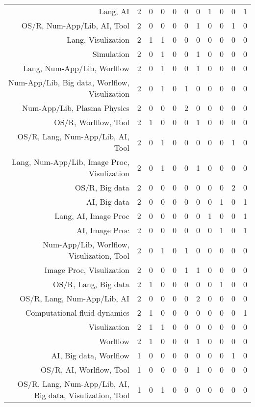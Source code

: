 {\begin{landscape}
\begin{longtable}[htb]{r|c|c|c|c|c|c|c|c|c|c}
{Lang, AI} & 2 & 0 & 0 & 0 & 0 & 0 & 1 & 0 & 0 & 1 \\%
{OS/R, Num-App/Lib, AI, Tool} & 2 & 0 & 0 & 0 & 0 & 1 & 0 & 0 & 1 & 0 \\%
{Lang, Visulization} & 2 & 1 & 1 & 0 & 0 & 0 & 0 & 0 & 0 & 0 \\%
{Simulation} & 2 & 0 & 1 & 0 & 0 & 1 & 0 & 0 & 0 & 0 \\%
{Lang, Num-App/Lib, Worlflow} & 2 & 0 & 1 & 0 & 0 & 1 & 0 & 0 & 0 & 0 \\%
{Num-App/Lib, Big data, Worlflow, Visulization} & 2 & 0 & 1 & 0 & 1 & 0 & 0 & 0 & 0 & 0 \\%
{Num-App/Lib, Plasma Physics} & 2 & 0 & 0 & 0 & 2 & 0 & 0 & 0 & 0 & 0 \\%
{OS/R, Worlflow, Tool} & 2 & 1 & 0 & 0 & 0 & 1 & 0 & 0 & 0 & 0 \\%
{OS/R, Lang, Num-App/Lib, AI, Tool} & 2 & 0 & 1 & 0 & 0 & 0 & 0 & 0 & 1 & 0 \\%
{Lang, Num-App/Lib, Image Proc, Visulization} & 2 & 0 & 1 & 0 & 0 & 1 & 0 & 0 & 0 & 0 \\%
{OS/R, Big data} & 2 & 0 & 0 & 0 & 0 & 0 & 0 & 0 & 2 & 0 \\%
{AI, Big data} & 2 & 0 & 0 & 0 & 0 & 0 & 0 & 1 & 0 & 1 \\%
{Lang, AI, Image Proc} & 2 & 0 & 0 & 0 & 0 & 0 & 1 & 0 & 0 & 1 \\%
{AI, Image Proc} & 2 & 0 & 0 & 0 & 0 & 0 & 0 & 1 & 0 & 1 \\%
{Num-App/Lib, Worlflow, Visulization, Tool} & 2 & 0 & 1 & 0 & 1 & 0 & 0 & 0 & 0 & 0 \\%
{Image Proc, Visulization} & 2 & 0 & 0 & 0 & 1 & 1 & 0 & 0 & 0 & 0 \\%
{OS/R, Lang, Big data} & 2 & 1 & 0 & 0 & 0 & 0 & 0 & 1 & 0 & 0 \\%
{OS/R, Lang, Num-App/Lib, AI} & 2 & 0 & 0 & 0 & 0 & 2 & 0 & 0 & 0 & 0 \\%
{Computational fluid dynamics} & 2 & 1 & 0 & 0 & 0 & 0 & 0 & 0 & 0 & 1 \\%
{Visulization} & 2 & 1 & 1 & 0 & 0 & 0 & 0 & 0 & 0 & 0 \\%
{Worlflow} & 2 & 1 & 0 & 0 & 0 & 1 & 0 & 0 & 0 & 0 \\%
{AI, Big data, Worlflow} & 1 & 0 & 0 & 0 & 0 & 0 & 0 & 0 & 1 & 0 \\%
{OS/R, AI, Worlflow, Tool} & 1 & 0 & 0 & 0 & 0 & 1 & 0 & 0 & 0 & 0 \\%
{OS/R, Lang, Num-App/Lib, AI, Big data, Visulization, Tool} & 1 & 0 & 1 & 0 & 0 & 0 & 0 & 0 & 0 & 0 \\%

\end{longtable}
\end{landscape}}
